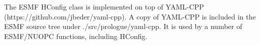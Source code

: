 

The ESMF HConfig class is implemented on top of YAML-CPP (https://github.com/jbeder/yaml-cpp).
A copy of YAML-CPP is included in the ESMF source tree under ./src/prologue/yaml-cpp. It is
used by a number of ESMF/NUOPC functions, including HConfig.

